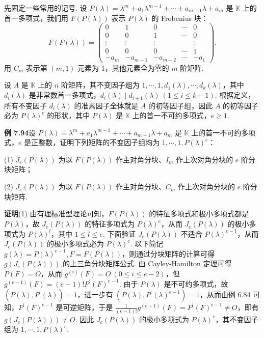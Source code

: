 \documentclass[UTF8,12pt,a4paper,fontset=fandol]{ctexart}
\begin{document}
先固定一些常用的记号. 设 $P(\lambda)=\lambda^m+a_1\lambda^{m-1}+\cdots+a_{m-1}\lambda+a_m$ 是 $\mathbb{K}$ 上的首一多项式，我们用 $F(P(\lambda))$ 表示 $P(\lambda)$ 的 Frobenius 块：
\[
F(P(\lambda))=\left(\begin{array}{ccccc}
0&1&0&\cdots&0\\
0&0&1&\cdots&0\\
\vdots&\vdots&\vdots&&\vdots\\
0&0&0&\cdots&1\\
-a_m&-a_{m-1}&-a_{m-2}&\cdots&-a_1
\end{array}\right).
\]
用 $C_m$ 表示第 $(m,1)$ 元素为 1，其他元素全为零的 $m$ 阶矩阵.

设 $A$ 是 $\mathbb{K}$ 上的 $n$ 阶矩阵，其不变因子组为 $1,\cdots,1,d_1(\lambda),\cdots,d_k(\lambda)$，其中 $d_i(\lambda)$ 是非常数首一多项式，$d_i(\lambda)\mid d_{i+1}(\lambda)\ (1\le i\le k-1)$. 根据定义，所有不变因子 $d_i(\lambda)$ 的准素因子全体就是 $A$ 的初等因子组，因此 $A$ 的初等因子必为 $P(\lambda)^e$ 的形状，其中 $P(\lambda)$ 是 $\mathbb{K}$ 上的首一不可约多项式，$e\ge1$.

\noindent\textbf{例 7.94}\quad 设 $P(\lambda)=\lambda^m+a_1\lambda^{m-1}+\cdots+a_{m-1}\lambda+a_m$ 是 $\mathbb{K}$ 上的首一不可约多项式，$e$ 是正整数，证明下列矩阵的不变因子组均为 $1,\cdots,1,P(\lambda)^e$：

(1) $J_e(P(\lambda))$ 为以 $F(P(\lambda))$ 作主对角分块、$I_m$ 作上次对角分块的 $e$ 阶分块矩阵；

(2) $\widetilde J_e(P(\lambda))$ 为以 $F(P(\lambda))$ 作主对角分块、$C_m$ 作上次对角分块的 $e$ 阶分块矩阵.

\noindent\textbf{证明}\quad (1) 由有理标准型理论可知，$F(P(\lambda))$ 的特征多项式和极小多项式都是 $P(\lambda)$，故 $J_e(P(\lambda))$ 的特征多项式为 $P(\lambda)^e$，从而 $J_e(P(\lambda))$ 的极小多项式为 $P(\lambda)^l$，其中 $1\le l\le e$. 下面验证 $J_e(P(\lambda))$ 不适合 $P(\lambda)^{e-1}$，从而 $J_e(P(\lambda))$ 的极小多项式必为 $P(\lambda)^e$. 以下简记 $g(\lambda)=P(\lambda)^{e-1},F=F(P(\lambda))$，则通过分块矩阵的计算可得 $g(J_e(P(\lambda)))$ 的上三角分块矩阵公式. 由 Cayley-Hamilton 定理可得 $P(F)=O$，从而 $g^{(i)}(F)=O\ (0\le i\le e-2)$，但 $g^{(e-1)}(F)=(e-1)!P^{\prime}(F)^{e-1}$. 由于 $P(\lambda)$ 是不可约多项式，故 $(P(\lambda),P^{\prime}(\lambda))=1$，进一步有 $(P(\lambda),P^{\prime}(\lambda)^{e-1})=1$，从而由例 6.84 可知，$P^{\prime}(F)^{e-1}$ 是可逆矩阵，于是 $\frac1{(e-1)!}g^{(e-1)}(F)=P^{\prime}(F)^{e-1}\ne O$，即有 $g(J_e(P(\lambda)))\ne O$. 因此 $J_e(P(\lambda))$ 的极小多项式为 $P(\lambda)^e$，其不变因子组为 $1,\cdots,1,P(\lambda)^e$.
\end{document}
